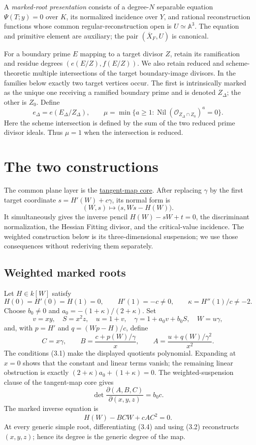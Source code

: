 \documentclass[11pt]{article}
\newcommand{\A}{\mathbb A}
\newcommand{\Nil}{\operatorname{Nil}}
\begin{document}
A \emph{marked-root presentation} consists of a degree-$N$ separable
equation $\Psi(T;y)=0$ over $K$, its normalized incidence over $Y$, and
rational reconstruction functions whose common regular-reconstruction open
is $U\simeq\A^3$.  The equation and primitive element are auxiliary; the
pair $(\overline X_F,U)$ is canonical.

For a boundary prime $E$ mapping to a target divisor $Z$, retain its
ramification and residue degrees $(e(E/Z),f(E/Z))$.  We also retain reduced
and scheme-theoretic multiple intersections of the target boundary-image
divisors.  In the families below exactly two target vertices occur.  The
first is intrinsically marked as the unique one receiving a ramified
boundary prime and is denoted $Z_\Delta$; the other is $Z_0$.  Define
\[
 e_\Delta=e(E_\Delta/Z_\Delta),\qquad
 \mu=\min\{a\ge1:\Nil(\mathcal O_{Z_\Delta\cap Z_0})^a=0\}.
                                                               \tag{2.1}
\]
Here the scheme intersection is defined by the sum of the two reduced prime
divisor ideals.  Thus $\mu=1$ when the intersection is reduced.

\section{The two constructions}

The common plane layer is the
\href{../../verified/TANGENT_MAP_CORE.md}{tangent-map core}.  After replacing
$\gamma$ by the first target coordinate $s=H'(W)+c\gamma$, its normal form is
\[
 (W,s)\longmapsto\bigl(s,Ws-H(W)\bigr).                 \tag{3.0}
\]
It simultaneously gives the inverse pencil $H(W)-sW+t=0$, the discriminant
normalization, the Hessian Fitting divisor, and the critical-value incidence.
The weighted construction below is its three-dimensional suspension; we use
those consequences without rederiving them separately.

\subsection{Weighted marked roots}

Let $H\in k[W]$ satisfy
\[
 H(0)=H'(0)=H(1)=0,\qquad H'(1)=-c\ne0,
 \qquad \kappa=H''(1)/c\ne-2.                              \tag{3.1}
\]
Choose $b_0\ne0$ and $a_0=-(1+\kappa)/(2+\kappa)$.  Set
\[
 v=xy,\quad S=x^2z,\quad u=1+v,\quad
 \gamma=1+a_0v+b_0S,\quad W=u\gamma,
\]
and, with $p=H'$ and $q=(Wp-H)/c$, define
\[
 C=x\gamma,\qquad
 B=\frac{c+p(W)/\gamma}{x},\qquad
 A=\frac{u+q(W)/\gamma^2}{x^2}.                            \tag{3.2}
\]
The conditions (3.1) make the displayed quotients polynomial.  Expanding
at $x=0$ shows that the constant and linear terms vanish; the remaining
linear obstruction is exactly
$(2+\kappa)a_0+(1+\kappa)=0$.  The weighted-suspension clause of the
tangent-map core gives
\[
 \det\frac{\partial(A,B,C)}{\partial(x,y,z)}=b_0c.         \tag{3.3}
\]
The marked inverse equation is
\[
 H(W)-BCW+cAC^2=0.                                        \tag{3.4}
\]
At every generic simple root, differentiating (3.4) and using (3.2)
reconstructs $(x,y,z)$; hence its degree is the generic degree of the map.
\end{document}
